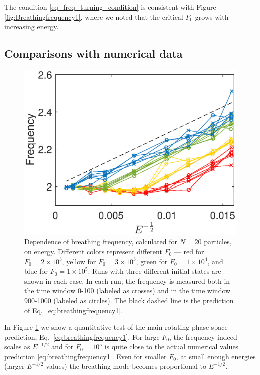 \documentclass[onecolumn,pra]{revtex4-1}
\begin{document}
The condition \eqref{eq_freq_turning_condition} is consistent with Figure
\ref{fig:Breathingfrequency1}, where we noted that the critical $F_0$ grows with increasing energy.


\subsection{Comparisons with numerical data}


\begin{figure}[h]
\centering
\includegraphics[scale=0.6]{ZhiyuPictures/freq_scanF_scanE_pre_Font18.eps}
\caption{Dependence of breathing frequency, calculated for $N=20$ particles, on energy.  Different
  colors represent different $F_0$ --- red for $F_0=2\times10^3$, yellow for $F_0=3\times10^3$,
  green for $F_0=1\times10^4$, and blue for $F_0=1\times10^5$.  Runs with three different initial
  states are shown in each case.  In each run, the frequency is measured both in the time window
  0-100 (labeled as crosses) and in the time window 900-1000 (labeled as circles). The black dashed
  line is the prediction of Eq.~\eqref{eq:breathingfrequency1}.}
\label{fig:Breathingfrequency4}
\end{figure}


In Figure \ref{fig:Breathingfrequency4} we show a quantitative test of the main rotating-phase-space
prediction, Eq.~\eqref{eq:breathingfrequency1}.  For large $F_0$, the frequency indeed scales as
$E^{-1/2}$ and for $F_0=10^5$ is quite close to the actual numerical values prediction
\eqref{eq:breathingfrequency1}.  Even for smaller $F_0$, at small enough energies (larger $E^{-1/2}$
values) the breathing mode becomes proportional to  $E^{-1/2}$. 
\end{document}
